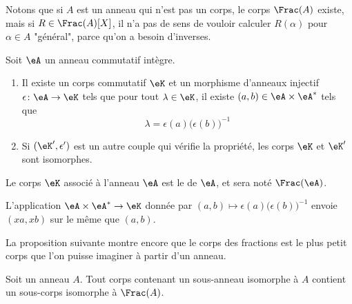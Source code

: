 Notons que si \( A\) est un anneau qui n'est pas un corps, le corps \( \Frac(A)\) existe, mais si \( R\in\Frac(A)[X]\), il n'a pas de sens de vouloir calculer \( R(\alpha)\) pour \( \alpha\in A\) "général", parce qu'on a besoin d'inverses.

\begin{theoremDef}     \label{ThogbhWgo}
    Soit \( \eA\) un anneau commutatif intègre.

    \begin{enumerate}
        \item
    Il existe un corps commutatif \( \eK\) et un morphisme d'anneaux injectif \( \epsilon\colon \eA\to \eK\) tels que pour tout \( \lambda\in\eK\), il existe \( (a,b)\in \eA\times \eA^*\) tels que
    \begin{equation}
        \lambda=\epsilon(a)\big( \epsilon(b) \big)^{-1}
    \end{equation}
\item
    Si \( (\eK',\epsilon')\) est un autre couple qui vérifie la propriété, les corps \( \eK\) et \( \eK'\) sont isomorphes.
    \end{enumerate}

    Le corps \( \eK\) associé à l'anneau \( \eA\) est le  de \( \eA\), et sera noté \( \Frac(\eA)\).
\end{theoremDef}

\begin{lemma}
    L'application \( \eA\times \eA^*\to \eK\) donnée par \( (a,b)\mapsto \epsilon(a)\big( \epsilon(b) \big)^{-1}\) envoie \( (xa,xb)\) sur le même que \( (a,b)\).
\end{lemma}

La proposition suivante montre encore que le corps des fractions est le plus petit corps que l'on puisse imaginer à partir d'un anneau.
\begin{proposition}
    Soit un anneau \( A\). Tout corps contenant un sous-anneau isomorphe à \( A\) contient un sous-corps isomorphe à \( \Frac(A)\).
\end{proposition}

